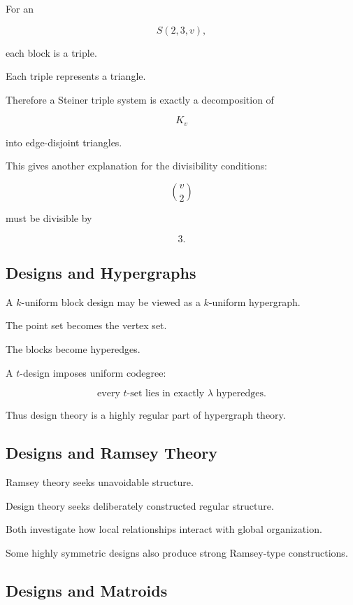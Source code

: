 For an

\[
S(2,3,v),
\]

each block is a triple.

Each triple represents a triangle.

Therefore a Steiner triple system is exactly a decomposition of

\[
K_v
\]

into edge-disjoint triangles.

This gives another explanation for the divisibility conditions:

\[
\binom v2
\]

must be divisible by

\[
3.
\]

\subsection{Designs and Hypergraphs}
\label{subsec:designs-hypergraphs}

A \(k\)-uniform block design may be viewed as a \(k\)-uniform
hypergraph.

The point set becomes the vertex set.

The blocks become hyperedges.

A \(t\)-design imposes uniform codegree:

\[
\boxed{
\text{every }t\text{-set lies in exactly }\lambda\text{ hyperedges}.
}
\]

Thus design theory is a highly regular part of hypergraph theory.

\subsection{Designs and Ramsey Theory}
\label{subsec:designs-ramsey}

Ramsey theory seeks unavoidable structure.

Design theory seeks deliberately constructed regular structure.

Both investigate how local relationships interact with global
organization.

Some highly symmetric designs also produce strong Ramsey-type
constructions.

\subsection{Designs and Matroids}
\label{subsec:designs-matroids}

